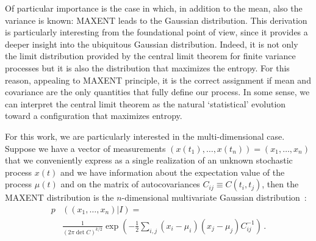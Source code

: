 \documentclass{aa}
\begin{document}
Of particular importance is the case in which, in addition to the mean, also the variance is known: MAXENT leads to the Gaussian distribution. 
This derivation is particularly interesting from the foundational point of view, since it provides a deeper insight into the ubiquitous Gaussian distribution.
Indeed, it is not only the limit distribution provided by the central limit theorem for finite variance processes but it is also the distribution that maximizes the entropy. For this reason, appealing to MAXENT principle, it is the correct assignment if mean and covariance are the only quantities that fully define our process. In some sense, we can interpret the central limit theorem as the natural `statistical' evolution toward a configuration that maximizes entropy.

For this work, we are particularly interested in the multi-dimensional case. Suppose we have a vector of measurements $(x(t_1),\ldots,x(t_n)) = (x_1, \ldots, x_n)$ that we conveniently express as a single realization of an unknown stochastic process $x(t)$ and we have information about the expectation value of the process $\mu(t)$ and on the matrix of autocovariances $C_{ij} \equiv C(t_i,t_j)$, then the MAXENT distribution is the $n$-dimensional multivariate Gaussian distribution~\citep{gregory_2005}: 
\begin{align}
    p&\left((x_1, \ldots, x_n)\vert I\right) = \nonumber \\
    &\frac{1}{\left(2 \pi \det C\right)^{k / 2}}\exp\left(-\frac{1}{2}\sum_{i,j}(x_i-\mu_i) (x_j-\mu_j)C^{-1}_{ij} \right)\,. 
\end{align}
\end{document}
